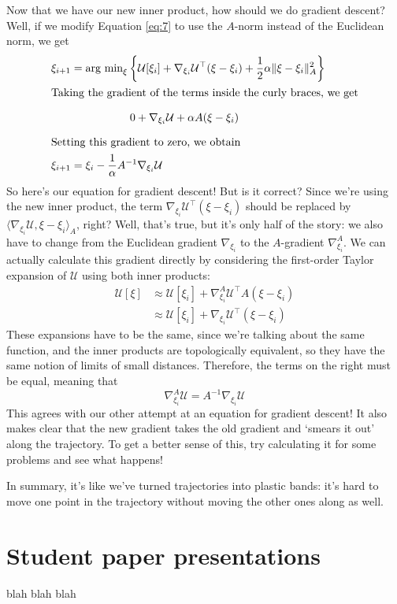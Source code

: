 \documentclass[twoside]{article}
\newcommand{\cu}{\mathcal{U}}
\begin{document}
Now that we have our new inner product, how should we do gradient descent? Well, if we modify Equation \eqref{eq:7} to use the $A$-norm instead of the Euclidean norm, we get
\begin{align}
  \label{eq:8}
  \xi_{i+1} &= \text{arg min}_\xi \left\{ \cu[\xi_i] + \nabla_{\xi_i}\cu^\top(\xi - \xi_i) + \frac{1}{2}\alpha \| \xi - \xi_i \|_A^2 \right\}\\
  \intertext{Taking the gradient of the terms inside the curly braces, we get}
            &\phantom{- \text{arg min}_\xi \bigg\{  }0 + \nabla_{\xi_i}\cu + \alpha A (\xi - \xi_i) \label{eq:17} \\
  \intertext{Setting this gradient to zero, we obtain}
  \xi_{i + 1} &= \xi_i - \frac{1}{\alpha} A^{-1}\nabla_{\xi_i}\cu
\end{align}
So here's our equation for gradient descent! But is it correct? Since we're using the new inner product, the term $\nabla_{\xi_i}\cu^\top(\xi - \xi_i)$ should be replaced by $\langle \nabla_{\xi_i}\cu, \xi - \xi_i \rangle_A$, right? Well, that's true, but it's only half of the story: we also have to change from the Euclidean gradient $\nabla_{\xi_i}$ to the $A$-gradient $\nabla^A_{\xi_i}$. We can actually calculate this gradient directly by considering the first-order Taylor expansion of $\cu$ using both inner products:
\begin{align}
  \label{eq:18}
  \cu[\xi] &\approx \cu[\xi_i] + \nabla^A_{\xi_i}\cu^\top A (\xi - \xi_i) \\
\label{eq:19}  &\approx \cu[\xi_i] + \nabla_{\xi_i} \cu^\top (\xi - \xi_i)
\end{align}
These expansions have to be the same, since we're talking about the same function, and the inner products are topologically equivalent, so they have the same notion of limits of small distances. Therefore, the terms on the right must be equal, meaning that
\begin{equation}
  \label{eq:20}
  \nabla_{\xi_i}^A \cu = A^{-1} \nabla_{\xi_i}\cu
\end{equation}
This agrees with our other attempt at an equation for gradient descent! It also makes clear that the new gradient takes the old gradient and `smears it out' along the trajectory. To get a better sense of this, try calculating it for some problems and see what happens!

In summary, it's like we've turned trajectories into plastic bands: it's hard to move one point in the trajectory without moving the other ones along as well.

\section{Student paper presentations}
\label{sec:stud-paper-pres}

blah blah blah
\end{document}
